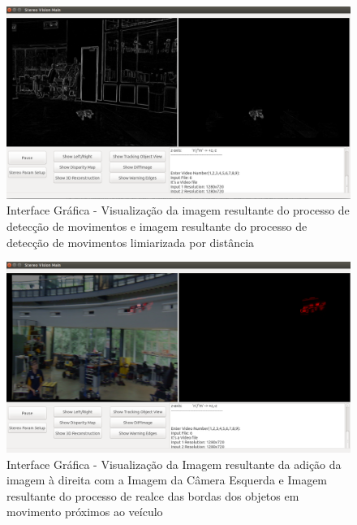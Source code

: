 \begin{figure}[H]
 	\centering
 	\includegraphics[scale=0.35]{./Resources/gui_showdiffimage_view.png}
 	\caption{Interface Gráfica - Visualização da imagem resultante do processo de detecção de movimentos e imagem resultante do processo de detecção de movimentos limiarizada por distância}
 	\label{gui_showdiffimage_view}
\end{figure}


\begin{figure}[H]
 	\centering
 	\includegraphics[scale=0.35]{./Resources/gui_showwarningedges_view.png}
 	\caption{Interface Gráfica - Visualização da Imagem resultante da adição da imagem à direita com a Imagem da Câmera Esquerda e Imagem resultante do processo de realce das bordas dos 
 	objetos em movimento próximos ao veículo}
 	\label{gui_showwarningedges_view}
\end{figure}

